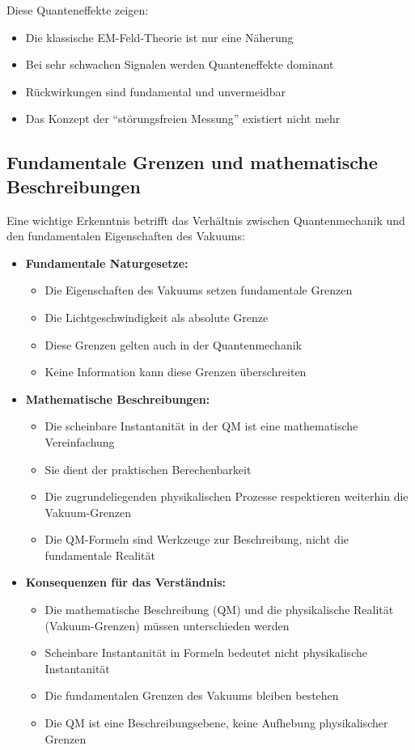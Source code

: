 \documentclass[12pt,a4paper]{article}
\begin{document}
	Diese Quanteneffekte zeigen:
	\begin{itemize}
		\item Die klassische EM-Feld-Theorie ist nur eine Näherung
		\item Bei sehr schwachen Signalen werden Quanteneffekte dominant
		\item Rückwirkungen sind fundamental und unvermeidbar
		\item Das Konzept der ``störungsfreien Messung'' existiert nicht mehr
	\end{itemize}
	
	\subsection{Fundamentale Grenzen und mathematische Beschreibungen}
	
	Eine wichtige Erkenntnis betrifft das Verhältnis zwischen Quantenmechanik und den fundamentalen Eigenschaften des Vakuums:
	
	\begin{itemize}
		\item \textbf{Fundamentale Naturgesetze:}
		\begin{itemize}
			\item Die Eigenschaften des Vakuums setzen fundamentale Grenzen
			\item Die Lichtgeschwindigkeit als absolute Grenze
			\item Diese Grenzen gelten auch in der Quantenmechanik
			\item Keine Information kann diese Grenzen überschreiten
		\end{itemize}
		
		\item \textbf{Mathematische Beschreibungen:}
		\begin{itemize}
			\item Die scheinbare Instantanität in der QM ist eine mathematische Vereinfachung
			\item Sie dient der praktischen Berechenbarkeit
			\item Die zugrundeliegenden physikalischen Prozesse respektieren weiterhin die Vakuum-Grenzen
			\item Die QM-Formeln sind Werkzeuge zur Beschreibung, nicht die fundamentale Realität
		\end{itemize}
		
		\item \textbf{Konsequenzen für das Verständnis:}
		\begin{itemize}
			\item Die mathematische Beschreibung (QM) und die physikalische Realität (Vakuum-Grenzen) müssen unterschieden werden
			\item Scheinbare Instantanität in Formeln bedeutet nicht physikalische Instantanität
			\item Die fundamentalen Grenzen des Vakuums bleiben bestehen
			\item Die QM ist eine Beschreibungsebene, keine Aufhebung physikalischer Grenzen
		\end{itemize}
	\end{itemize}
	
\end{document}
